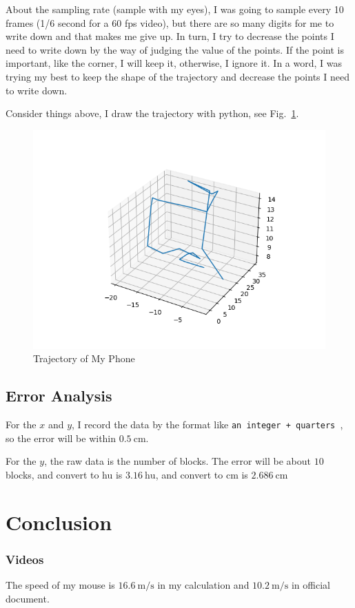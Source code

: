 \documentclass{article}
\begin{document}
About the sampling rate (sample with my eyes), I was going to sample every 10 frames (1/6 second for a $60$ fps video), but there are so many digits for me to write down and that makes me give up. In turn, I try to decrease the points I need to write down by the way of judging the value of the points. If the point is important, like the corner, I will keep it, otherwise, I ignore it. In a word, I was trying my best to keep the shape of the trajectory and decrease the points I need to write down.

Consider things above, I draw the trajectory with python, see Fig.~\ref{fig:trajectoryOfMyPhone}.

\begin{figure}[!h]
	\centering
	\includegraphics[width=4 in]{../pic/trajectoryOfMyPhone.png}
	\caption{Trajectory of My Phone}
	\label{fig:trajectoryOfMyPhone}
\end{figure}

\subsection{Error Analysis}
For the $x$ and $y$, I record the data by the format like \verb|an integer + quarters |, so the error will be within $0.5 ~ \mathrm{cm}$.

For the $y$, the raw data is the number of blocks. The error will be about $10$ blocks, and convert to hu is $3.16 ~ \mathrm{hu}$, and convert to cm is $2.686~ \mathrm{cm}$

\section{Conclusion}
\subsubsection*{Videos}
The speed of my mouse is $16.6 ~\mathrm{m/s}$ in my calculation and $10.2 ~\mathrm{m/s}$ in official document.
\end{document}
